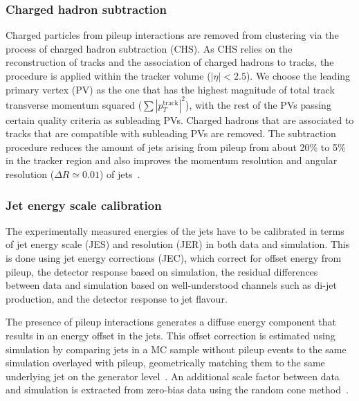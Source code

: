 \subsubsection{Charged hadron subtraction}
Charged particles from pileup interactions are removed from clustering via the process of charged hadron subtraction (CHS). As CHS relies on the reconstruction of tracks and the association of charged hadrons to tracks, the procedure is applied within the tracker volume ($|\eta| < 2.5$). We choose the leading primary vertex (PV) as the one that has the highest magnitude of total track transverse momentum squared ($\sum |p_T^{\mathrm{track}}|^2$), with the rest of the PVs passing certain quality criteria as subleading PVs. Charged hadrons that are associated to tracks that are compatible with subleading PVs are removed. The subtraction procedure reduces the amount of jets arising from pileup from about 20\% to 5\% in the tracker region and also improves the momentum resolution and angular resolution ($\Delta R \simeq 0.01$) of jets~\cite{CMS:2014ata}.

\subsubsection{Jet energy scale calibration}
\label{sec:jes_calibration}
The experimentally measured energies of the jets have to be calibrated in terms of jet energy scale (JES) and resolution (JER) in both data and simulation. This is done using jet energy corrections (JEC), which correct for offset energy from pileup, the detector response based on simulation, the residual differences between data and simulation based on well-understood channels such as di-jet production, and the detector response to jet flavour. 

The presence of pileup interactions generates a diffuse energy component that results in an energy offset in the jets. This offset correction is estimated using simulation by comparing jets in a MC sample without pileup events to the same simulation overlayed with pileup, geometrically matching them to the same underlying jet on the generator level~\cite{cms_jec_2017}. An additional scale factor between data and simulation is extracted from zero-bias data using the random cone method~\cite{Chatrchyan:2011ds}.  

